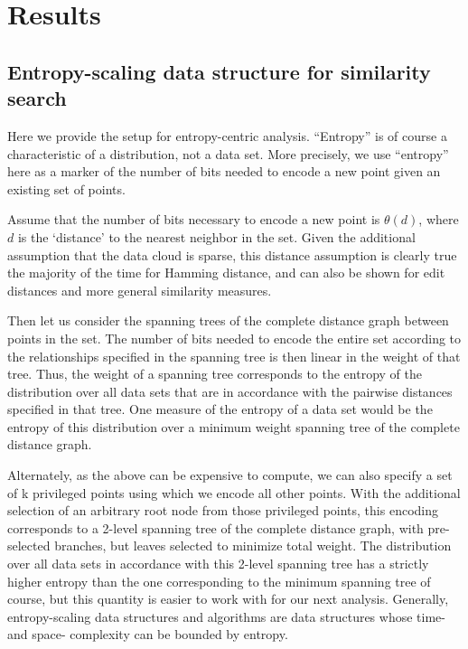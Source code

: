 \documentclass{amsbook}
\theoremstyle{definition}
\theoremstyle{remark}
\numberwithin{equation}{section}
\begin{document}
\chapter{Results}
\section{Entropy-scaling data structure for similarity search}

Here we provide the setup for entropy-centric analysis.
``Entropy'' is of course a characteristic of a distribution, not a data set.
More precisely, we use ``entropy'' here as a marker of the number of bits needed to encode a new point given an existing set of points.


Assume that the number of bits necessary to encode a new point is $\theta(d)$, where $d$ is the ‘distance’ to the nearest neighbor in the set.
Given the additional assumption that the data cloud is sparse, this distance assumption is clearly true the majority of the time for Hamming distance, and can also be shown for edit distances and more general similarity measures.

Then let us consider the spanning trees of the complete distance graph between points in the set.
The number of bits needed to encode the entire set according to the relationships specified in the spanning tree is then linear in the weight of that tree.
Thus, the weight of a spanning tree corresponds to the entropy of the distribution over all data sets that are in accordance with the pairwise distances specified in that tree.
One measure of the entropy of a data set would be the entropy of this distribution over a minimum weight spanning tree of the complete distance graph.

Alternately, as the above can be expensive to compute, we can also specify a set of k privileged points using which we encode all other points.
With the additional selection of an arbitrary root node from those privileged points, this encoding corresponds to a 2-level spanning tree of the complete distance graph, with pre-selected branches, but leaves selected to minimize total weight.
The distribution over all data sets in accordance with this 2-level spanning tree has a strictly higher entropy than the one corresponding to the minimum spanning tree of course, but this quantity is easier to work with for our next analysis.
Generally, entropy-scaling data structures and algorithms are data structures whose time- and space- complexity can be bounded by entropy.
\end{document}
